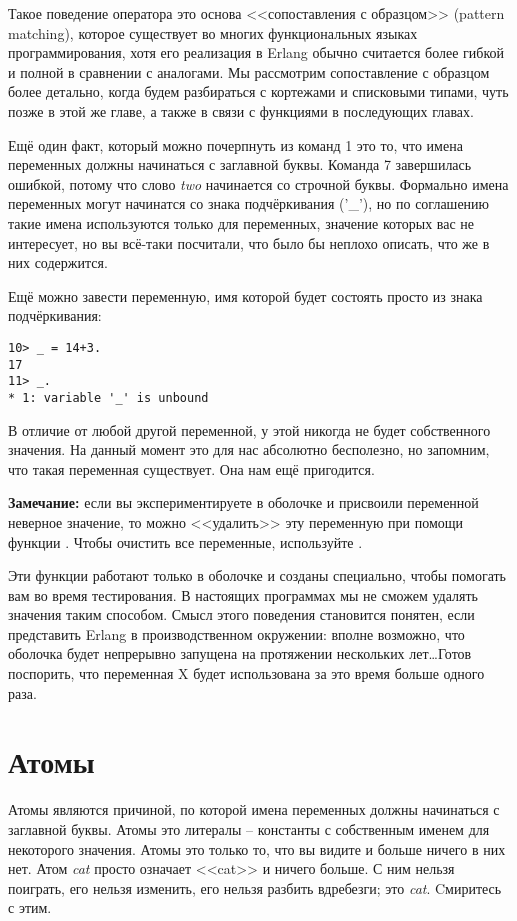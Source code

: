 Такое поведение оператора \ops{\strut=} это основа <<сопоставления с образцом>> (pattern matching), которое существует во многих функциональных языках программирования, хотя его реализация в Erlang обычно считается более гибкой и полной в сравнении с аналогами.
Мы рассмотрим сопоставление с образцом более детально, когда будем разбираться с кортежами и списковыми типами, чуть позже в этой же главе, а также в связи с функциями в последующих главах.

Ещё один факт, который можно почерпнуть из команд 1 это то, что имена переменных должны начинаться с заглавной буквы.
Команда 7 завершилась ошибкой, потому что слово \emph{two} начинается со строчной буквы.
Формально имена переменных  могут начинатся со знака подчёркивания ('\_'), но по соглашению такие имена используются только для переменных, значение которых вас не интересует, но вы всё\--таки посчитали, что было бы неплохо описать, что же в них содержится.

Ещё можно завести переменную, имя которой будет состоять просто из знака подчёркивания:
\begin{lstlisting}[style=repl]
10> _ = 14+3.
17
11> _.
* 1: variable '_' is unbound
\end{lstlisting}

В отличие от любой другой переменной, у этой никогда не будет собственного значения.
На данный момент это для нас абсолютно бесполезно, но запомним, что такая переменная существует.
Она нам ещё пригодится.\\ 
\colorbox{lgray}
{
\begin{minipage}{1.0\linewidth}
\textbf{Замечание:} если вы экспериментируете в оболочке и присвоили переменной неверное значение, то можно <<удалить>> эту переменную при помощи функции .
Чтобы очистить все переменные, используйте .
\par 
Эти функции работают только в оболочке и созданы специально, чтобы помогать вам во время тестирования.
В настоящих программах мы не сможем удалять значения таким способом.
Смысл этого поведения становится понятен, если представить Erlang в производственном окружении: вполне возможно, что оболочка будет непрерывно запущена на протяжении нескольких лет\ldots Готов поспорить, что переменная X будет использована за это время больше одного раза.
\end{minipage}
}
\section{Атомы}\label{atoms}
Атомы являются причиной, по которой имена переменных должны начинаться с заглавной буквы.
Атомы это литералы \--- константы с собственным именем для некоторого значения.
Атомы это только то, что вы видите и больше ничего в них нет.
Атом \emph{cat} просто означает <<cat>> и ничего больше.
С ним нельзя поиграть, его нельзя изменить, его нельзя разбить вдребезги; это \emph{cat}.
Cмиритесь с этим.

